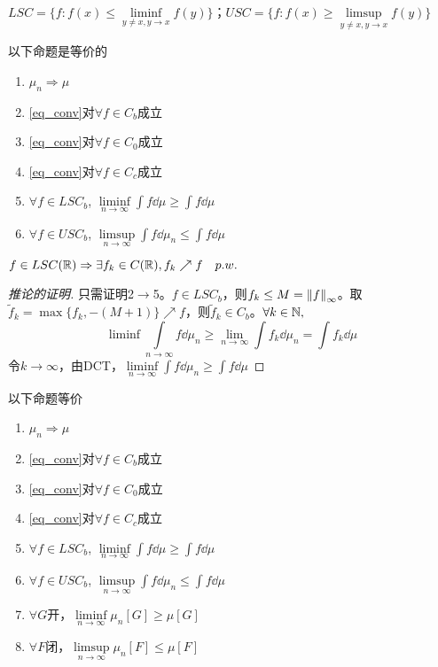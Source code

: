 \documentclass{ctexbook}
\begin{document}
$LSC=\{f: f(x)\leq\liminf\limits_{y\neq x,y\to x}f(y)\}$；$USC=\{f:f(x)\geq \limsup\limits_{y\neq x,y\to x}f(y)\}$

\begin{Cor}
  以下命题是等价的
  \begin{enumerate}
  \item $\mu_{n}\Rightarrow \mu$
  \item \ref{eq_conv}对$\forall f\in C_{b}$成立
  \item \ref{eq_conv}对$\forall f\in C_{0}$成立
  \item \ref{eq_conv}对$\forall f\in C_{c}$成立
  \item $\forall f\in LSC_{b}$, $\liminf\limits_{n\to\infty}\int f\dd\mu\geq \int f\dd\mu$
  \item $\forall f\in USC_{b}$, $\limsup\limits_{n\to\infty}\int f\dd\mu_{n}\leq \int f\dd\mu$
  \end{enumerate}
\end{Cor}
\begin{Rmk}
  $f\in LSC(\mathbb{R})\Rightarrow\exists f_{k}\in C(\mathbb{R}),f_{k}\nearrow f\quad p.w.$
\end{Rmk}
\begin{proof}[推论的证明]
  只需证明2$\to$5。$f\in LSC_{b}$，则$f_{k}\leq M=\left\|f\right\|_{\infty}$。取$\tilde f_{k}=\max\{f_{k},-(M+1)\}\nearrow f$，则$\tilde f_{k}\in C_{b}$。$\forall k\in\mathbb{N}, $
  \[\liminf\int \limits_{n\to\infty}f\dd\mu_{n}\geq \lim\limits_{n\to\infty}\int f_{k}\dd\mu_{n}=\int f_{k}\dd\mu\]
  令$k\to \infty$，由DCT，$\liminf\limits_{n\to\infty}\int f\dd\mu_{n}\geq\int f\dd\mu$
\end{proof}

\begin{Cor}
  以下命题等价
  \begin{enumerate}
  \item $\mu_{n}\Rightarrow \mu$
  \item \ref{eq_conv}对$\forall f\in C_{b}$成立
  \item \ref{eq_conv}对$\forall f\in C_{0}$成立
  \item \ref{eq_conv}对$\forall f\in C_{c}$成立
  \item $\forall f\in LSC_{b}$, $\liminf\limits_{n\to\infty}\int f\dd\mu\geq \int f\dd\mu$
  \item $\forall f\in USC_{b}$, $\limsup\limits_{n\to\infty}\int f\dd\mu_{n}\leq \int f\dd\mu$
  \item $\forall G$开，$\liminf\limits_{n\to\infty} \mu_{n}[G]\geq \mu[G]$
  \item $\forall F$闭，$\limsup\limits_{n\to\infty} \mu_{n}[F]\leq \mu[F]$
  \end{enumerate}
\end{Cor}
\end{document}
